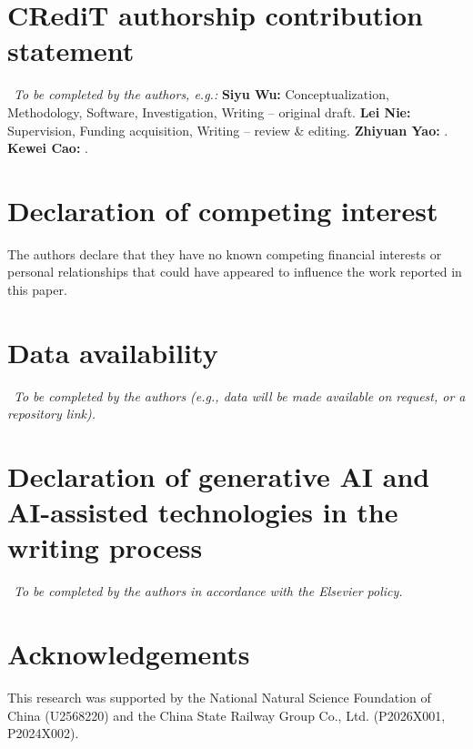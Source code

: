 \section*{CRediT authorship contribution statement}
\tbd~\textit{To be completed by the authors, e.g.:} \textbf{Siyu Wu:} Conceptualization, Methodology, Software, Investigation, Writing -- original draft. \textbf{Lei Nie:} Supervision, Funding acquisition, Writing -- review \& editing. \textbf{Zhiyuan Yao:} \tbd. \textbf{Kewei Cao:} \tbd.

\section*{Declaration of competing interest}
The authors declare that they have no known competing financial interests or personal relationships that could have appeared to influence the work reported in this paper.

\section*{Data availability}
\tbd~\textit{To be completed by the authors (e.g., data will be made available on request, or a repository link).}

\section*{Declaration of generative AI and AI-assisted technologies in the writing process}
\tbd~\textit{To be completed by the authors in accordance with the Elsevier policy.}

\section*{Acknowledgements}
This research was supported by the National Natural Science Foundation of China (U2568220) and the China State Railway Group Co., Ltd. (P2026X001, P2024X002).
